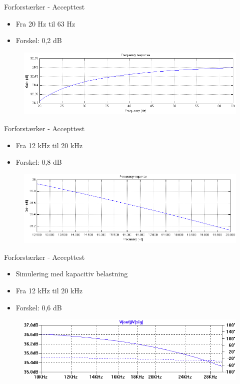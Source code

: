 \begin{frame}{Forforstærker - Accepttest}
\begin{itemize}
\item Fra 20 Hz til 63 Hz
\item Forskel: 0,2 dB 
\end{itemize}
\begin{figure}[h]
\centering
\includegraphics[scale=.3]{images/fr20-63.png}
\end{figure}
\end{frame}

\begin{frame}{Forforstærker - Accepttest}
\begin{itemize}
\item Fra 12 kHz til 20 kHz
\item Forskel: 0,8 dB
\end{itemize}
\begin{figure}[h]
\centering
\includegraphics[scale=.3]{images/fr12-20k.png}
\end{figure}
\end{frame}

\begin{frame}{Forforstærker - Accepttest}
\begin{itemize}
\item Simulering med kapacitiv belastning
\item Fra 12 kHz til 20 kHz 
\item Forskel: 0,6 dB
\end{itemize}
\begin{figure}[h]
\centering
\includegraphics[scale=.4]{images/fr12-20k-sim.png}
\end{figure}
\end{frame}

